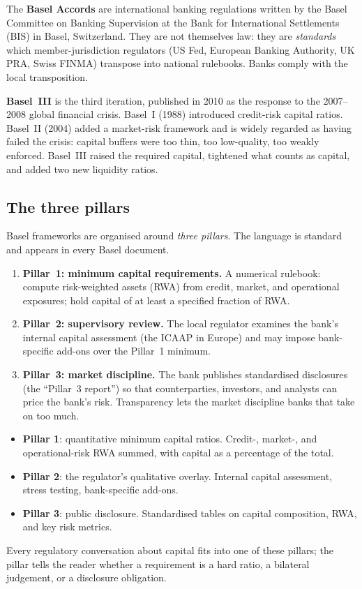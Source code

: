 The \textbf{Basel Accords} are international banking regulations
written by the Basel Committee on Banking Supervision at the Bank
for International Settlements (BIS) in Basel, Switzerland.  They
are not themselves law: they are \emph{standards} which
member-jurisdiction regulators (US Fed, European Banking
Authority, UK PRA, Swiss FINMA) transpose into national
rulebooks.  Banks comply with the local transposition.

\textbf{Basel~III} is the third iteration, published in 2010 as
the response to the 2007--2008 global financial crisis.  Basel~I
(1988) introduced credit-risk capital ratios.  Basel~II (2004)
added a market-risk framework and is widely regarded as having
failed the crisis: capital buffers were too thin, too low-quality,
too weakly enforced.  Basel~III raised the required capital,
tightened what counts as capital, and added two new liquidity ratios.

\subsection{The three pillars}

Basel frameworks are organised around \emph{three pillars}.  The
language is standard and appears in every Basel document.

\begin{enumerate}
  \item \textbf{Pillar~1: minimum capital requirements.}  A
    numerical rulebook: compute risk-weighted assets (RWA) from
    credit, market, and operational exposures; hold capital of
    at least a specified fraction of RWA.
  \item \textbf{Pillar~2: supervisory review.}  The local
    regulator examines the bank's internal capital assessment
    (the ICAAP in Europe) and may impose bank-specific add-ons
    over the Pillar~1 minimum.
  \item \textbf{Pillar~3: market discipline.}  The bank
    publishes standardised disclosures (the ``Pillar~3 report'')
    so that counterparties, investors, and analysts can price
    the bank's risk.  Transparency lets the market discipline
    banks that take on too much.
\end{enumerate}

\begin{keyfactbox}
\begin{itemize}
  \item \textbf{Pillar 1}: quantitative minimum capital ratios.
    Credit-, market-, and operational-risk RWA summed, with
    capital as a percentage of the total.
  \item \textbf{Pillar 2}: the regulator's qualitative overlay.
    Internal capital assessment, stress testing, bank-specific
    add-ons.
  \item \textbf{Pillar 3}: public disclosure.  Standardised
    tables on capital composition, RWA, and key risk metrics.
\end{itemize}
Every regulatory conversation about capital fits into one of
these pillars; the pillar tells the reader whether a requirement
is a hard ratio, a bilateral judgement, or a disclosure obligation.
\end{keyfactbox}

